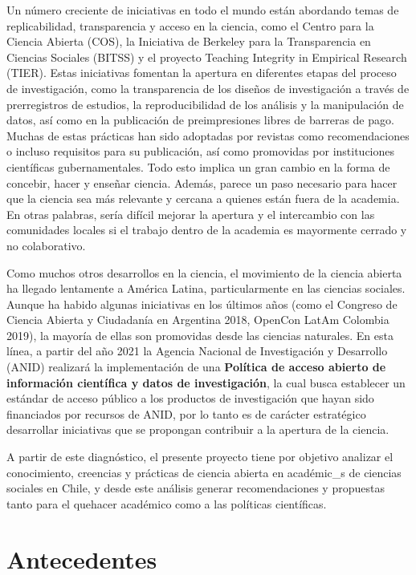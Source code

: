 \documentclass[
  letterpaper,
  DIV=11,
  numbers=noendperiod]{scrreprt}
\begin{document}
Un número creciente de iniciativas en todo el mundo están abordando
temas de replicabilidad, transparencia y acceso en la ciencia, como el
Centro para la Ciencia Abierta (COS), la Iniciativa de Berkeley para la
Transparencia en Ciencias Sociales (BITSS) y el proyecto Teaching
Integrity in Empirical Research (TIER). Estas iniciativas fomentan la
apertura en diferentes etapas del proceso de investigación, como la
transparencia de los diseños de investigación a través de prerregistros
de estudios, la reproducibilidad de los análisis y la manipulación de
datos, así como en la publicación de preimpresiones libres de barreras
de pago. Muchas de estas prácticas han sido adoptadas por revistas como
recomendaciones o incluso requisitos para su publicación, así como
promovidas por instituciones científicas gubernamentales. Todo esto
implica un gran cambio en la forma de concebir, hacer y enseñar ciencia.
Además, parece un paso necesario para hacer que la ciencia sea más
relevante y cercana a quienes están fuera de la academia. En otras
palabras, sería difícil mejorar la apertura y el intercambio con las
comunidades locales si el trabajo dentro de la academia es mayormente
cerrado y no colaborativo.

Como muchos otros desarrollos en la ciencia, el movimiento de la ciencia
abierta ha llegado lentamente a América Latina, particularmente en las
ciencias sociales. Aunque ha habido algunas iniciativas en los últimos
años (como el Congreso de Ciencia Abierta y Ciudadanía en Argentina
2018, OpenCon LatAm Colombia 2019), la mayoría de ellas son promovidas
desde las ciencias naturales. En esta línea, a partir del año 2021 la
Agencia Nacional de Investigación y Desarrollo (ANID) realizará la
implementación de una \textbf{Política de acceso abierto de información
científica y datos de investigación}, la cual busca establecer un
estándar de acceso público a los productos de investigación que hayan
sido financiados por recursos de ANID, por lo tanto es de carácter
estratégico desarrollar iniciativas que se propongan contribuir a la
apertura de la ciencia.

A partir de este diagnóstico, el presente proyecto tiene por objetivo
analizar el conocimiento, creencias y prácticas de ciencia abierta en
académic\_s de ciencias sociales en Chile, y desde este análisis generar
recomendaciones y propuestas tanto para el quehacer académico como a las
políticas científicas.


\hypertarget{antecedentes}{%
\chapter{Antecedentes}\label{antecedentes}}
\end{document}
